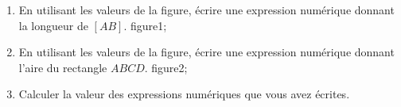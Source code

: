 \documentclass[exercice]{thedocument}%
\begin{document}
%
\begin{enumerate}
    \item En utilisant les valeurs de la figure, écrire une expression
    numérique donnant la longueur de $[AB]$.\vskip10pt
    \<figure1;\vskip10pt
    \item En utilisant les valeurs de la figure, écrire une expression
    numérique donnant l'aire du rectangle $ABCD$.\vskip10pt
    \<figure2;\vskip10pt\item Calculer la valeur des expressions numériques que vous avez
    écrites.
\end{enumerate}
\end{document}
